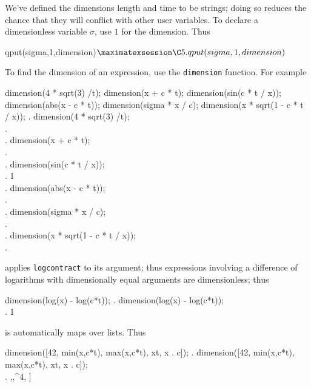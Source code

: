 \noindent We've defined the dimensions length and time to be 
strings; doing so reduces the chance that they will conflict  
with other user variables. To declare a dimensionless  variable
$\sigma$, use $1$ for the dimension. Thus

\beginmaximasession
qput(sigma,1,dimension)$
\maximatexsession
\C5.  qput(sigma,1,dimension)$ \\
\endmaximasession

\noindent To find the dimension of an expression, use the
{\tt dimension} function. For example

\beginmaximasession
dimension(4 * sqrt(3) /t);
dimension(x + c * t);
dimension(sin(c * t / x));
dimension(abs(x - c * t));
dimension(sigma * x / c);
dimension(x * sqrt(1 - c * t / x));
\maximatexsession
{}.  dimension(4 * sqrt(3) /t); \\
.   \\
.  dimension(x + c * t); \\
.   \\
.  dimension(sin(c * t / x)); \\
.  1 \\
.  dimension(abs(x - c * t)); \\
.   \\
.  dimension(sigma * x / c); \\
.   \\
.  dimension(x * sqrt(1 - c * t / x)); \\
.   \\
\endmaximasession

 applies {\tt logcontract} to its 
argument; thus expressions involving a difference of logarithms
with dimensionally equal arguments are dimensionless; thus

\beginmaximasession
dimension(log(x) - log(c*t));
\maximatexsession
{}.  dimension(log(x) - log(c*t)); \\
.  1 \\
\endmaximasession


 is automatically maps over lists. Thus

\beginmaximasession
dimension([42, min(x,c*t), max(x,c*t), x^^4, x . c]);
\maximatexsession
{}.  dimension([42, min(x,c*t), max(x,c*t), x^^4, x . c]); \\
.  \left[ 1,\linebreak[0],\linebreak[0],\linebreak[0]^{4},\linebreak[0] \right] \\
\endmaximasession

